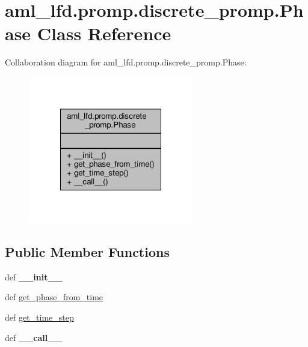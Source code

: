 \hypertarget{classaml__lfd_1_1promp_1_1discrete__promp_1_1_phase}{\section{aml\-\_\-lfd.\-promp.\-discrete\-\_\-promp.\-Phase Class Reference}
\label{classaml__lfd_1_1promp_1_1discrete__promp_1_1_phase}
}


Collaboration diagram for aml\-\_\-lfd.\-promp.\-discrete\-\_\-promp.\-Phase\-:\nopagebreak
\begin{figure}[H]
\begin{center}
\leavevmode
\includegraphics[width=204pt]{classaml__lfd_1_1promp_1_1discrete__promp_1_1_phase__coll__graph}
\end{center}
\end{figure}
\subsection*{Public Member Functions}
\begin{DoxyCompactItemize}
\item 
\hypertarget{classaml__lfd_1_1promp_1_1discrete__promp_1_1_phase_a9d16c1098588e43abcb36c425d8780e8}{def {\bfseries \-\_\-\-\_\-init\-\_\-\-\_\-}}\label{classaml__lfd_1_1promp_1_1discrete__promp_1_1_phase_a9d16c1098588e43abcb36c425d8780e8}

\item 
def \hyperlink{classaml__lfd_1_1promp_1_1discrete__promp_1_1_phase_aa47356db55b05e13d381096785b3f88b}{get\-\_\-phase\-\_\-from\-\_\-time}
\item 
def \hyperlink{classaml__lfd_1_1promp_1_1discrete__promp_1_1_phase_a4f5dc1ce0776d35b734381b659faa77c}{get\-\_\-time\-\_\-step}
\item 
\hypertarget{classaml__lfd_1_1promp_1_1discrete__promp_1_1_phase_aa8ccbab698c4d162cd21a509064d75ca}{def {\bfseries \-\_\-\-\_\-call\-\_\-\-\_\-}}\label{classaml__lfd_1_1promp_1_1discrete__promp_1_1_phase_aa8ccbab698c4d162cd21a509064d75ca}

\end{DoxyCompactItemize}


